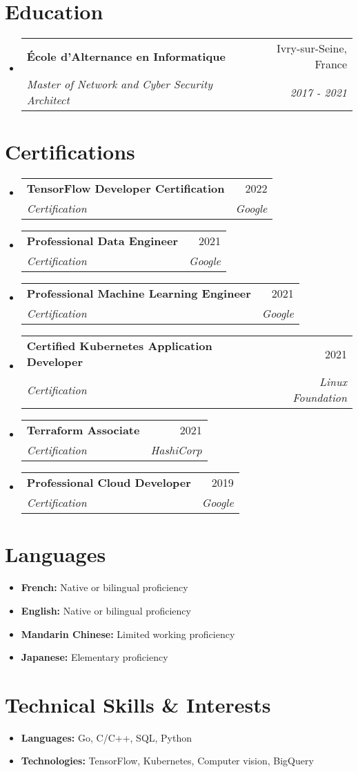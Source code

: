 \documentclass[letterpaper,11pt]{article}
\makeatletter
\newcommand{\resumeItem}[1]{
  \item\small{#1 \vspace{-2pt}}
}
\newcommand{\resumeSubheading}[4]{
  \vspace{-1pt}\item
    \begin{tabular*}{0.97\textwidth}[t]{l@{\extracolsep{\fill}}r}
      \textbf{#1} & #2 \\
      \textit{\small#3} & \textit{\small #4} \\
    \end{tabular*}\vspace{-5pt}
}
\newcommand{\resumeSubHeadingListStart}{\begin{itemize}[leftmargin=*]}
\newcommand{\resumeSubHeadingListEnd}{\end{itemize}}
\makeatother
\begin{document}
\section{Education}
\resumeSubHeadingListStart{}
\resumeSubheading{École d'Alternance en Informatique}
{Ivry-sur-Seine, France}
{Master of Network and Cyber Security Architect}
{2017 - 2021}
\resumeSubHeadingListEnd{}


\section{Certifications}
\resumeSubHeadingListStart{}
\resumeSubheading{TensorFlow Developer Certification}
{2022}
{Certification}
{Google}
\resumeSubheading{Professional Data Engineer}
{2021}
{Certification}
{Google}
\resumeSubheading{Professional Machine Learning Engineer}
{2021}
{Certification}
{Google}
\resumeSubheading{Certified Kubernetes Application Developer}
{2021}
{Certification}
{Linux Foundation}
\resumeSubheading{Terraform Associate}
{2021}
{Certification}
{HashiCorp}
\resumeSubheading{Professional Cloud Developer}
{2019}
{Certification}
{Google}
\resumeSubHeadingListEnd{}


\section{Languages}
\resumeSubHeadingListStart{}
\resumeItem{
	\textbf{French:}{
		Native or bilingual proficiency
	}
}
\resumeItem{
	\textbf{English:}{
		Native or bilingual proficiency
	}
}
\resumeItem{
	\textbf{Mandarin Chinese:}{
		Limited working proficiency
	}
}
\resumeItem{
	\textbf{Japanese:}{
		Elementary proficiency
	}
}
\resumeSubHeadingListEnd{}


\section{Technical Skills \& Interests}
\resumeSubHeadingListStart{}
\resumeItem{
	\textbf{Languages:}{
		Go, C/C++, SQL, Python
	}
}
\resumeItem{
	\textbf{Technologies:}{
		TensorFlow, Kubernetes, Computer vision, BigQuery
	}
}
\resumeSubHeadingListEnd{}
\end{document}
